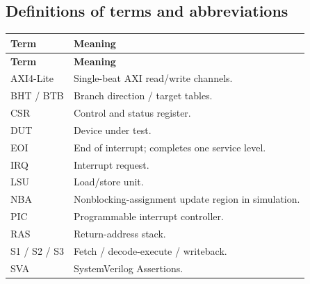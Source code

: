 \documentclass[11pt]{article}
\begin{document}
\subsection{Definitions of terms and abbreviations}
{\small
\begin{longtable}{@{}L{0.2300\dimexpr\linewidth-12pt\relax}L{0.7700\dimexpr\linewidth-12pt\relax}@{}}
\toprule
\textbf{Term} & \textbf{Meaning} \\ \midrule
\endfirsthead
\toprule
\textbf{Term} & \textbf{Meaning} \\ \midrule
\endhead
AXI4-Lite & Single-beat AXI read/write channels. \\ \addlinespace[3pt]
BHT / BTB & Branch direction / target tables. \\ \addlinespace[3pt]
CSR & Control and status register. \\ \addlinespace[3pt]
DUT & Device under test. \\ \addlinespace[3pt]
EOI & End of interrupt; completes one service level. \\ \addlinespace[3pt]
IRQ & Interrupt request. \\ \addlinespace[3pt]
LSU & Load/store unit. \\ \addlinespace[3pt]
NBA & Nonblocking-assignment update region in simulation. \\ \addlinespace[3pt]
PIC & Programmable interrupt controller. \\ \addlinespace[3pt]
RAS & Return-address stack. \\ \addlinespace[3pt]
S1 / S2 / S3 & Fetch / decode-execute / writeback. \\ \addlinespace[3pt]
SVA & SystemVerilog Assertions. \\*
\bottomrule\end{longtable}}

\end{document}
